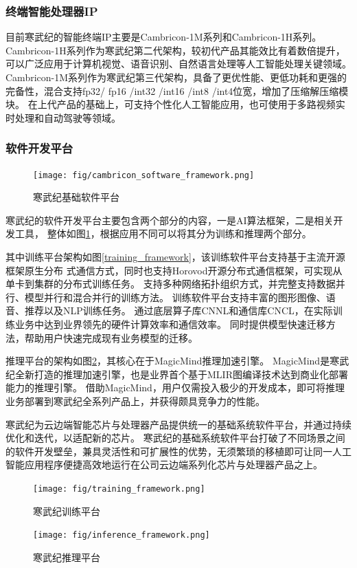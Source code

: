 \subsubsection{终端智能处理器IP}
目前寒武纪的智能终端IP主要是Cambricon-1M系列和Cambricon-1H系列。
Cambricon-1H系列作为寒武纪第二代架构，较初代产品其能效比有着数倍提升，可以广泛应用于计算机视觉、语音识别、自然语言处理等人工智能处理关键领域。
Cambricon-1M系列作为寒武纪第三代架构，具备了更优性能、更低功耗和更强的完备性，混合支持fp32/ fp16 /int32 /int16 /int8 /int4位宽，增加了压缩解压缩模块。 
在上代产品的基础上，可支持个性化人工智能应用，也可使用于多路视频实时处理和自动驾驶等领域。
\subsubsection{软件开发平台}
\begin{figure}[!htb]
  \centering
  \texttt{[image: fig/cambricon\_software\_framework.png]}
  \caption{寒武纪基础软件平台}
  \label{cambricon_software_framework}
\end{figure}
寒武纪的软件开发平台主要包含两个部分的内容，一是AI算法框架，二是相关开发工具，
整体如图\ref{cambricon_software_framework}，根据应用不同可以将其分为训练和推理两个部分。\par
其中训练平台架构如图\ref{training_framework}，该训练软件平台支持基于主流开源框架原生分布
式通信方式，同时也支持Horovod开源分布式通信框架，可实现从单卡到集群的分布式训练任务。
支持多种网络拓扑组织方式，并完整支持数据并行、模型并行和混合并行的训练方法。
训练软件平台支持丰富的图形图像、语音、推荐以及NLP训练任务。
通过底层算子库CNNL和通信库CNCL，在实际训练业务中达到业界领先的硬件计算效率和通信效率。
同时提供模型快速迁移方法，帮助用户快速完成现有业务模型的迁移。\par
推理平台的架构如图\ref{inference_framework}，其核心在于MagicMind推理加速引擎。
MagicMind是寒武纪全新打造的推理加速引擎，也是业界首个基于MLIR图编译技术达到商业化部署能力的推理引擎。
借助MagicMind，用户仅需投入极少的开发成本，即可将推理业务部署到寒武纪全系列产品上，并获得颇具竞争力的性能。\par
寒武纪为云边端智能芯片与处理器产品提供统一的基础系统软件平台，并通过持续优化和迭代，以适配新的芯片。
寒武纪的基础系统软件平台打破了不同场景之间的软件开发壁垒，兼具灵活性和可扩展性的优势，无须繁琐的移植即可让同一人工智能应用程序便捷高效地运行在公司云边端系列化芯片与处理器产品之上。
\begin{figure}[htb]
  \centering
\begin{minipage}{0.49\linewidth}
  \centering
  \texttt{[image: fig/training\_framework.png]}
  \caption{寒武纪训练平台}\label{training_framework}
\end{minipage}
\begin{minipage}{0.49\linewidth}
  \centering
  \texttt{[image: fig/inference\_framework.png]}
  \caption{寒武纪推理平台}\label{inference_framework}
\end{minipage}
\end{figure}





